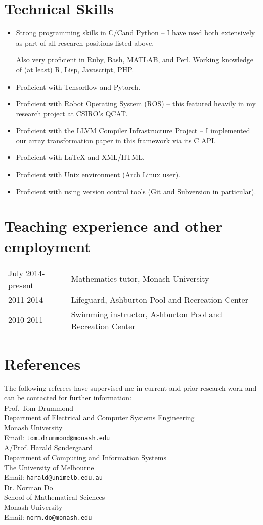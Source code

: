 \documentclass[12pt,a4paper]{article}
\newcommand{\mailto}[1]{\texttt{#1}}
\newcommand{\CPP}
{C\nolinebreak[4]\hspace{-.05em}\raisebox{.22ex}{\footnotesize\bf ++ }}
\newenvironment{llist}
  {\renewcommand{\arraystretch}{1.5}\begin{longtable}{p{3.5cm} p{12cm}}}
  {\end{longtable}}
\begin{document}
\section*{Technical Skills}
\begin{itemize}
  \item Strong programming skills in C/\CPP and Python -- I have used both
    extensively as part of all research positions listed above.

    Also very proficient in Ruby, Bash, MATLAB, and Perl. Working knowledge of (at least)
    R, Lisp, Javascript, PHP.
  \item Proficient with Tensorflow and Pytorch.
  \item Proficient with Robot Operating System (ROS) -- this featured heavily
    in my research project at CSIRO's QCAT.
  \item Proficient with the LLVM Compiler Infrastructure Project -- I
    implemented our array transformation paper in this framework via its \CPP
    API.
  \item Proficient with {\LaTeX} and XML/HTML.
  \item Proficient with Unix environment (Arch Linux user).
  \item Proficient with using version control tools (Git and Subversion in
    particular).
\end{itemize}

\section*{Teaching experience and other employment}
\begin{llist}
  July 2014-present & Mathematics tutor, Monash University \\
  2011-2014 & Lifeguard, Ashburton Pool and Recreation Center \\
  2010-2011 & Swimming instructor, Ashburton Pool and Recreation Center \\
\end{llist}

\section*{References}
The following referees have supervised me in current and prior research work
and can be contacted for further information: \\

\noindent
Prof. Tom Drummond  \\
Department of Electrical and Computer Systems Engineering \\
Monash University \\
Email: \mailto{tom.drummond@monash.edu} \\

\noindent
A/Prof. Harald S\o ndergaard  \\
Department of Computing and Information Systems \\
The University of Melbourne \\
Email: \mailto{harald@unimelb.edu.au} \\

\noindent
Dr. Norman Do \\
School of Mathematical Sciences \\
Monash University \\
Email: \mailto{norm.do@monash.edu}
\end{document}
